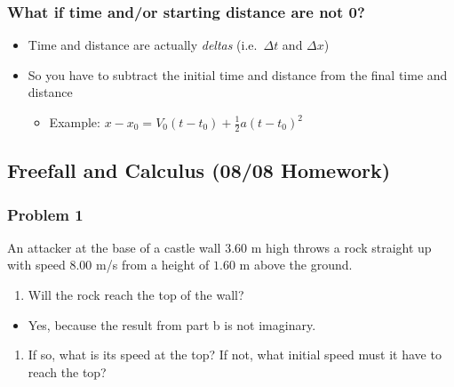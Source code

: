 \documentclass[
  letterpaper,
  DIV=11,
  numbers=noendperiod]{scrartcl}
\providecommand{\tightlist}{%
  \setlength{\itemsep}{0pt}\setlength{\parskip}{0pt}}\usepackage{longtable,booktabs,array}
\begin{document}
\hypertarget{what-if-time-andor-starting-distance-are-not-0}{%
\subsubsection{What if time and/or starting distance are not
0?}\label{what-if-time-andor-starting-distance-are-not-0}}

\begin{itemize}
\tightlist
\item
  Time and distance are actually \emph{deltas} (i.e.~\(\Delta t\) and
  \(\Delta x\))
\item
  So you have to subtract the initial time and distance from the final
  time and distance

  \begin{itemize}
  \tightlist
  \item
    Example: \(x-x_0 = V_0(t-t_0) + \frac{1}{2}a(t-t_0)^2\)
  \end{itemize}
\end{itemize}

\hypertarget{freefall-and-calculus-0808-homework}{%
\subsection{Freefall and Calculus (08/08
Homework)}\label{freefall-and-calculus-0808-homework}}

\hypertarget{problem-1-3}{%
\subsubsection{Problem 1}\label{problem-1-3}}

An attacker at the base of a castle wall \(3.60\) m high throws a rock
straight up with speed \(8.00\) m/s from a height of \(1.60\) m above
the ground.

\begin{enumerate}
\def\labelenumi{(\alph{enumi})}
\tightlist
\item
  Will the rock reach the top of the wall?
\end{enumerate}

\begin{itemize}
\tightlist
\item
  Yes, because the result from part b is not imaginary.
\end{itemize}

\begin{enumerate}
\def\labelenumi{(\alph{enumi})}
\setcounter{enumi}{1}
\tightlist
\item
  If so, what is its speed at the top? If not, what initial speed must
  it have to reach the top?
\end{enumerate}
\end{document}
